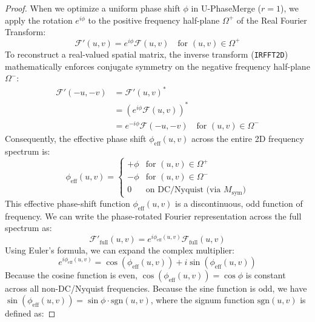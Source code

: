 \begin{proof}
When we optimize a uniform phase shift $\phi$ in U-PhaseMerge ($r=1$), we apply the rotation $e^{i\phi}$ to the positive frequency half-plane $\Omega^+$ of the Real Fourier Transform:
\begin{equation}
    \mathcal{F}'(u, v) = e^{i\phi} \mathcal{F}(u, v) \quad \text{for } (u, v) \in \Omega^+
\end{equation}
To reconstruct a real-valued spatial matrix, the inverse transform (\texttt{IRFFT2D}) mathematically enforces conjugate symmetry on the negative frequency half-plane $\Omega^-$:
\begin{align}
    \mathcal{F}'(-u, -v) &= \mathcal{F}'(u, v)^* \nonumber \\
    &= \left(e^{i\phi} \mathcal{F}(u, v)\right)^* \nonumber \\
    &= e^{-i\phi} \mathcal{F}(-u, -v) \quad \text{for } (u, v) \in \Omega^-
\end{align}
Consequently, the effective phase shift $\phi_{\text{eff}}(u, v)$ across the entire 2D frequency spectrum is:
\begin{equation}
    \phi_{\text{eff}}(u, v) = \begin{cases} 
    +\phi & \text{for } (u, v) \in \Omega^+ \\ 
    -\phi & \text{for } (u, v) \in \Omega^- \\ 
    0 & \text{on DC/Nyquist (via } M_{\text{sym}}\text{)}
    \end{cases}
\end{equation}
This effective phase-shift function $\phi_{\text{eff}}(u, v)$ is a discontinuous, odd function of frequency. We can write the phase-rotated Fourier representation across the full spectrum as:
\begin{equation}
    \mathcal{F}'_{\text{full}}(u, v) = e^{i \phi_{\text{eff}}(u, v)} \mathcal{F}_{\text{full}}(u, v)
\end{equation}
Using Euler's formula, we can expand the complex multiplier:
\begin{equation}
    e^{i \phi_{\text{eff}}(u, v)} = \cos\left(\phi_{\text{eff}}(u, v)\right) + i \sin\left(\phi_{\text{eff}}(u, v)\right)
\end{equation}
Because the cosine function is even, $\cos(\phi_{\text{eff}}(u, v)) = \cos\phi$ is constant across all non-DC/Nyquist frequencies. Because the sine function is odd, we have $\sin(\phi_{\text{eff}}(u, v)) = \sin\phi \cdot \text{sgn}(u, v)$, where the signum function $\text{sgn}(u, v)$ is defined as:

\end{proof}
